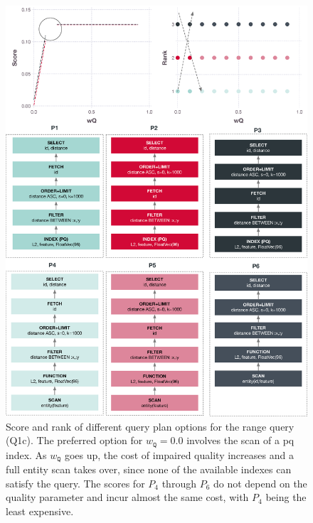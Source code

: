 \begin{figure}[p]
    \centering
    \includegraphics[width=\textwidth]{figures/analytics/analytics-cottontail-cost-range-annotated}
    \caption{Score and rank of different query plan options for the range query (Q1c). The preferred option for $w_{\texttt{Q}} = 0.0$ involves the scan of a \acrshort{pq} index. As $w_{\texttt{Q}}$ goes up, the cost of impaired quality increases and a full entity scan takes over, since none of the available indexes can satisfy the query. The scores for $P_4$ through $P_6$ do not depend on the quality parameter and incur almost the same cost, with $P_4$ being the least expensive.}
    \label{figure:cottontail_analytics_cost_range}
\end{figure}

